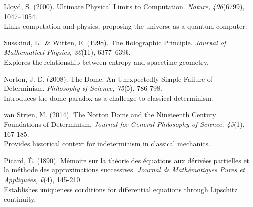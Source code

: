 \documentclass[12pt]{article}
\begin{document}
\begin{thebibliography}{99}
Lloyd, S. (2000). Ultimate Physical Limits to Computation. \textit{Nature, 406}(6799), 1047–1054. \\
Links computation and physics, proposing the universe as a quantum computer.

Susskind, L., \& Witten, E. (1998). The Holographic Principle. \textit{Journal of Mathematical Physics, 36}(11), 6377–6396. \\
Explores the relationship between entropy and spacetime geometry.

Norton, J. D. (2008). The Dome: An Unexpectedly Simple Failure of Determinism. \textit{Philosophy of Science, 75}(5), 786-798. \\
Introduces the dome paradox as a challenge to classical determinism.

van Strien, M. (2014). The Norton Dome and the Nineteenth Century Foundations of Determinism. \textit{Journal for General Philosophy of Science, 45}(1), 167-185. \\
Provides historical context for indeterminism in classical mechanics.

Picard, É. (1890). Mémoire sur la théorie des équations aux dérivées partielles et la méthode des approximations successives. \textit{Journal de Mathématiques Pures et Appliquées, 6}(4), 145-210. \\
Establishes uniqueness conditions for differential equations through Lipschitz continuity.

\end{thebibliography}
\end{document}
